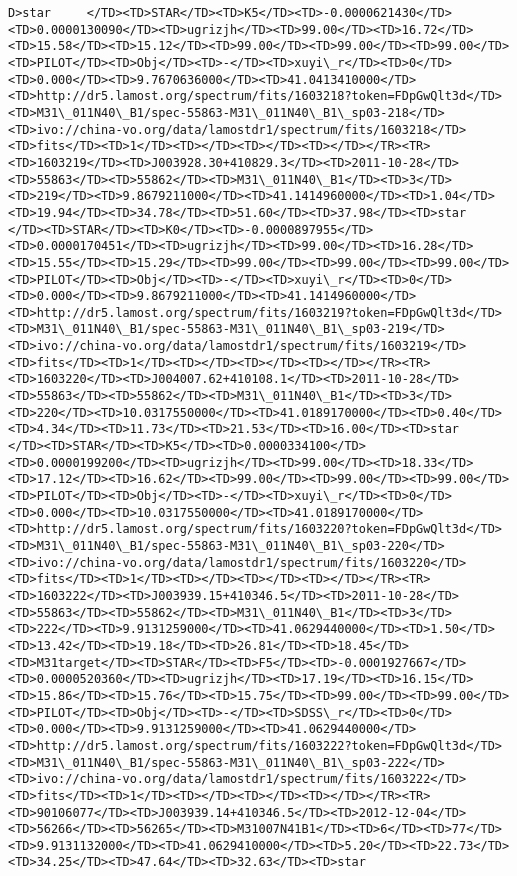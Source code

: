 \documentclass[11pt]{article}
\begin{document}
\begin{Verbatim}[commandchars=\\\{\}]
D>star     </TD><TD>STAR</TD><TD>K5</TD><TD>-0.0000621430</TD><TD>0.0000130090</TD><TD>ugrizjh</TD><TD>99.00</TD><TD>16.72</TD><TD>15.58</TD><TD>15.12</TD><TD>99.00</TD><TD>99.00</TD><TD>99.00</TD><TD>PILOT</TD><TD>Obj</TD><TD>-</TD><TD>xuyi\_r</TD><TD>0</TD><TD>0.000</TD><TD>9.7670636000</TD><TD>41.0413410000</TD><TD>http://dr5.lamost.org/spectrum/fits/1603218?token=FDpGwQlt3d</TD><TD>M31\_011N40\_B1/spec-55863-M31\_011N40\_B1\_sp03-218</TD><TD>ivo://china-vo.org/data/lamostdr1/spectrum/fits/1603218</TD><TD>fits</TD><TD>1</TD><TD></TD><TD></TD><TD></TD></TR><TR><TD>1603219</TD><TD>J003928.30+410829.3</TD><TD>2011-10-28</TD><TD>55863</TD><TD>55862</TD><TD>M31\_011N40\_B1</TD><TD>3</TD><TD>219</TD><TD>9.8679211000</TD><TD>41.1414960000</TD><TD>1.04</TD><TD>19.94</TD><TD>34.78</TD><TD>51.60</TD><TD>37.98</TD><TD>star     </TD><TD>STAR</TD><TD>K0</TD><TD>-0.0000897955</TD><TD>0.0000170451</TD><TD>ugrizjh</TD><TD>99.00</TD><TD>16.28</TD><TD>15.55</TD><TD>15.29</TD><TD>99.00</TD><TD>99.00</TD><TD>99.00</TD><TD>PILOT</TD><TD>Obj</TD><TD>-</TD><TD>xuyi\_r</TD><TD>0</TD><TD>0.000</TD><TD>9.8679211000</TD><TD>41.1414960000</TD><TD>http://dr5.lamost.org/spectrum/fits/1603219?token=FDpGwQlt3d</TD><TD>M31\_011N40\_B1/spec-55863-M31\_011N40\_B1\_sp03-219</TD><TD>ivo://china-vo.org/data/lamostdr1/spectrum/fits/1603219</TD><TD>fits</TD><TD>1</TD><TD></TD><TD></TD><TD></TD></TR><TR><TD>1603220</TD><TD>J004007.62+410108.1</TD><TD>2011-10-28</TD><TD>55863</TD><TD>55862</TD><TD>M31\_011N40\_B1</TD><TD>3</TD><TD>220</TD><TD>10.0317550000</TD><TD>41.0189170000</TD><TD>0.40</TD><TD>4.34</TD><TD>11.73</TD><TD>21.53</TD><TD>16.00</TD><TD>star     </TD><TD>STAR</TD><TD>K5</TD><TD>0.0000334100</TD><TD>0.0000199200</TD><TD>ugrizjh</TD><TD>99.00</TD><TD>18.33</TD><TD>17.12</TD><TD>16.62</TD><TD>99.00</TD><TD>99.00</TD><TD>99.00</TD><TD>PILOT</TD><TD>Obj</TD><TD>-</TD><TD>xuyi\_r</TD><TD>0</TD><TD>0.000</TD><TD>10.0317550000</TD><TD>41.0189170000</TD><TD>http://dr5.lamost.org/spectrum/fits/1603220?token=FDpGwQlt3d</TD><TD>M31\_011N40\_B1/spec-55863-M31\_011N40\_B1\_sp03-220</TD><TD>ivo://china-vo.org/data/lamostdr1/spectrum/fits/1603220</TD><TD>fits</TD><TD>1</TD><TD></TD><TD></TD><TD></TD></TR><TR><TD>1603222</TD><TD>J003939.15+410346.5</TD><TD>2011-10-28</TD><TD>55863</TD><TD>55862</TD><TD>M31\_011N40\_B1</TD><TD>3</TD><TD>222</TD><TD>9.9131259000</TD><TD>41.0629440000</TD><TD>1.50</TD><TD>13.42</TD><TD>19.18</TD><TD>26.81</TD><TD>18.45</TD><TD>M31target</TD><TD>STAR</TD><TD>F5</TD><TD>-0.0001927667</TD><TD>0.0000520360</TD><TD>ugrizjh</TD><TD>17.19</TD><TD>16.15</TD><TD>15.86</TD><TD>15.76</TD><TD>15.75</TD><TD>99.00</TD><TD>99.00</TD><TD>PILOT</TD><TD>Obj</TD><TD>-</TD><TD>SDSS\_r</TD><TD>0</TD><TD>0.000</TD><TD>9.9131259000</TD><TD>41.0629440000</TD><TD>http://dr5.lamost.org/spectrum/fits/1603222?token=FDpGwQlt3d</TD><TD>M31\_011N40\_B1/spec-55863-M31\_011N40\_B1\_sp03-222</TD><TD>ivo://china-vo.org/data/lamostdr1/spectrum/fits/1603222</TD><TD>fits</TD><TD>1</TD><TD></TD><TD></TD><TD></TD></TR><TR><TD>90106077</TD><TD>J003939.14+410346.5</TD><TD>2012-12-04</TD><TD>56266</TD><TD>56265</TD><TD>M31007N41B1</TD><TD>6</TD><TD>77</TD><TD>9.9131132000</TD><TD>41.0629410000</TD><TD>5.20</TD><TD>22.73</TD><TD>34.25</TD><TD>47.64</TD><TD>32.63</TD><TD>star      
\end{Verbatim}
\end{document}
